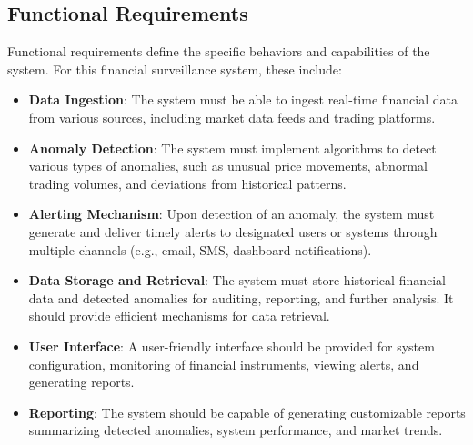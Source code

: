 \subsection{Functional Requirements}
Functional requirements define the specific behaviors and capabilities of the system. For this financial surveillance system, these include:
\begin{itemize}
    \item \textbf{Data Ingestion}: The system must be able to ingest real-time financial data from various sources, including market data feeds and trading platforms.
    \item \textbf{Anomaly Detection}: The system must implement algorithms to detect various types of anomalies, such as unusual price movements, abnormal trading volumes, and deviations from historical patterns.
    \item \textbf{Alerting Mechanism}: Upon detection of an anomaly, the system must generate and deliver timely alerts to designated users or systems through multiple channels (e.g., email, SMS, dashboard notifications).
    \item \textbf{Data Storage and Retrieval}: The system must store historical financial data and detected anomalies for auditing, reporting, and further analysis. It should provide efficient mechanisms for data retrieval.
    \item \textbf{User Interface}: A user-friendly interface should be provided for system configuration, monitoring of financial instruments, viewing alerts, and generating reports.
    \item \textbf{Reporting}: The system should be capable of generating customizable reports summarizing detected anomalies, system performance, and market trends.
\end{itemize}

